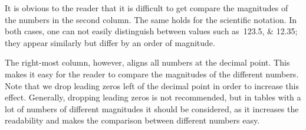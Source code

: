 It is obvious to the reader that it is difficult to get compare the magnitudes
of the numbers in the second column.  The same holds for the scientific
notation.  In both cases, one can not easily distinguish between values such
as~\numlist{123.5;12.35}; they appear similarly but differ by an order of
magnitude.

The right-most column, however, aligns all numbers at the decimal point.  This
makes it easy for the reader to compare the magnitudes of the different numbers.
Note that we drop leading zeros left of the decimal point in order to increase
this effect.  Generally, dropping leading zeros is not recommended, but in
tables with a lot of numbers of different magnitudes it should be considered, as
it increases the readability and makes the comparison between different numbers
easy.

